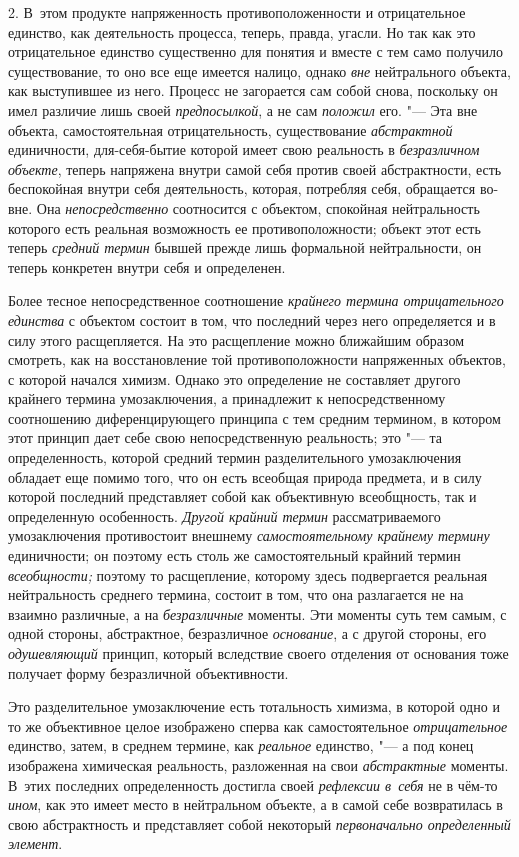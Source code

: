 2. В~этом продукте напряженность противоположенности и
отрицательное единство, как деятельность процесса, теперь, правда, угасли.
Но так как это отрицательное единство существенно для понятия и вместе с
тем само получило существование, то оно все еще имеется налицо, однако
{\em вне} нейтрального
объекта, как выступившее из него. Процесс не загорается сам собой снова,
поскольку он имел различие лишь своей
{\em предпосылкой}, а не
сам {\em положил} его. "---
Эта вне объекта, самостоятельная отрицательность,
существование {\em абстрактной}
единичности, для-себя-бытие которой имеет свою реальность в
{\em безразличном объекте},
теперь напряжена внутри самой себя против своей
абстрактности, есть беспокойная внутри себя деятельность, которая,
потребляя себя, обращается во-вне. Она
{\em непосредственно}
соотносится с объектом, спокойная нейтральность которого есть
реальная возможность ее противоположности; объект этот есть теперь
{\em средний термин}
бывшей прежде лишь формальной нейтральности, он теперь
конкретен внутри себя и определенен.

Более тесное непосредственное соотношение
{\em крайнего термина отрицательного
единства} с объектом состоит в том, что последний через него
определяется и в силу этого расщепляется. На это расщепление можно
ближайшим образом смотреть, как на восстановление той противоположности
напряженных объектов, с которой начался химизм. Однако это определение не
составляет другого крайнего термина умозаключения, а принадлежит к
непосредственному соотношению диференцирующего принципа с тем средним
термином, в котором этот принцип дает себе свою непосредственную
реальность; это "--- та определенность, которой средний термин
разделительного умозаключения обладает еще помимо того, что он есть
всеобщая природа предмета, и в силу которой последний представляет собой
как объективную всеобщность, так и определенную особенность.
{\em Другой крайний термин}
рассматриваемого умозаключения противостоит внешнему
{\em самостоятельному крайнему термину}
единичности; он поэтому есть столь же самостоятельный крайний
термин {\em всеобщности;}
поэтому то расщепление, которому здесь подвергается реальная
нейтральность среднего термина, состоит в том, что она разлагается не на
взаимно различные, а на
{\em безразличные}
моменты. Эти моменты суть тем самым, с одной стороны,
абстрактное, безразличное
{\em основание}, а с
другой стороны, его {\em одушевляющий}
принцип, который вследствие своего отделения
от основания тоже получает форму безразличной объективности.

Это разделительное умозаключение есть тотальность химизма, в
которой одно и то же объективное целое изображено сперва как
самостоятельное {\em отрицательное}
единство, затем, в среднем термине, как
{\em реальное} единство,
"--- а под конец изображена химическая реальность, разложенная
на свои {\em абстрактные}
моменты. В~этих последних определенность достигла своей
{\em рефлексии в~себя} не
в чём-то {\em ином},
как это имеет место в нейтральном объекте, а в самой себе
возвратилась в свою абстрактность и представляет собой некоторый
{\em первоначально определенный
элемент}.

